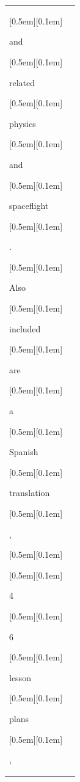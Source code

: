 \begin{table}[ht]
\begin{tabular}{@{}l p{13cm}@{}}
{\setlength{\fboxsep}{1pt}\raisebox{0pt}[0.5em][0.1em]{\colorbox{SkyBlue!55}{\strut{ and}}}}{\setlength{\fboxsep}{1pt}\raisebox{0pt}[0.5em][0.1em]{\colorbox{Salmon!60}{\strut{ related}}}}{\setlength{\fboxsep}{1pt}\raisebox{0pt}[0.5em][0.1em]{\colorbox{DarkOrchid!25}{\strut{ physics}}}}{\setlength{\fboxsep}{1pt}\raisebox{0pt}[0.5em][0.1em]{\colorbox{SkyBlue!55}{\strut{ and}}}}{\setlength{\fboxsep}{1pt}\raisebox{0pt}[0.5em][0.1em]{\colorbox{Salmon!60}{\strut{ spaceflight}}}}{\setlength{\fboxsep}{1pt}\raisebox{0pt}[0.5em][0.1em]{\colorbox{DarkOrchid!25}{\strut{.}}}}{\setlength{\fboxsep}{1pt}\raisebox{0pt}[0.5em][0.1em]{\colorbox{Salmon!60}{\strut{ Also}}}}{\setlength{\fboxsep}{1pt}\raisebox{0pt}[0.5em][0.1em]{\colorbox{DarkOrchid!25}{\strut{ included}}}}{\setlength{\fboxsep}{1pt}\raisebox{0pt}[0.5em][0.1em]{\colorbox{SkyBlue!55}{\strut{ are}}}}{\setlength{\fboxsep}{1pt}\raisebox{0pt}[0.5em][0.1em]{\colorbox{SkyBlue!55}{\strut{ a}}}}{\setlength{\fboxsep}{1pt}\raisebox{0pt}[0.5em][0.1em]{\colorbox{Salmon!60}{\strut{ Spanish}}}}{\setlength{\fboxsep}{1pt}\raisebox{0pt}[0.5em][0.1em]{\colorbox{DarkOrchid!25}{\strut{ translation}}}}{\setlength{\fboxsep}{1pt}\raisebox{0pt}[0.5em][0.1em]{\colorbox{SkyBlue!55}{\strut{,}}}}{\setlength{\fboxsep}{1pt}\raisebox{0pt}[0.5em][0.1em]{\colorbox{DarkOrchid!25}{\strut{ }}}}{\setlength{\fboxsep}{1pt}\raisebox{0pt}[0.5em][0.1em]{\colorbox{SkyBlue!55}{\strut{4}}}}{\setlength{\fboxsep}{1pt}\raisebox{0pt}[0.5em][0.1em]{\colorbox{Salmon!60}{\strut{6}}}}{\setlength{\fboxsep}{1pt}\raisebox{0pt}[0.5em][0.1em]{\colorbox{Salmon!60}{\strut{ lesson}}}}{\setlength{\fboxsep}{1pt}\raisebox{0pt}[0.5em][0.1em]{\colorbox{DarkOrchid!25}{\strut{ plans}}}}{\setlength{\fboxsep}{1pt}\raisebox{0pt}[0.5em][0.1em]{\colorbox{SkyBlue!55}{\strut{,}}}}


\end{tabular}
\end{table}
